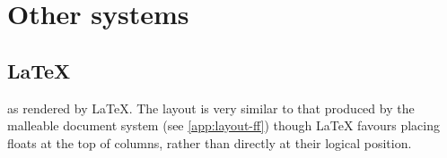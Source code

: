 \begin{center}

\end{center}
\clearpage
\section{Other systems}
\label{app:layout-other}

\subsection{\LaTeX}

\cite{Pinkney2011} as rendered by \LaTeX. The layout is very similar to that produced by the malleable document system (see \ref{app:layout-ff}) though \LaTeX{} favours placing floats at the top of columns, rather than directly at their logical position.

